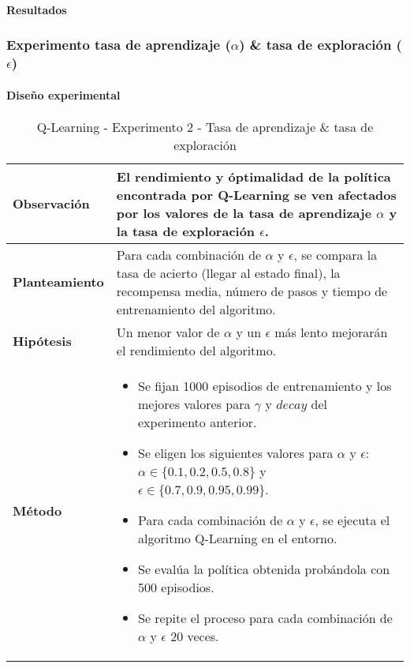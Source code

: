 \paragraph{Resultados}

\subsubsection{Experimento tasa de aprendizaje (\(\alpha\)) \& tasa de exploración (\(\epsilon\))}

\paragraph{Diseño experimental}

\begin{table}[H]
    \centering
    \begin{tabularx}{\textwidth}{|p{4cm}|X|} %
        \hline %
        \textbf{Observación} & El rendimiento y óptimalidad de la política encontrada por Q-Learning se ven afectados por los valores de la tasa de aprendizaje $\alpha$ y la tasa de exploración $\epsilon$. 
        \\ \hline 
        \textbf{Planteamiento} & Para cada combinación de \(\alpha\) y \(\epsilon\), se compara la tasa de acierto (llegar al estado final), la recompensa media, número de pasos y tiempo de entrenamiento del algoritmo.
        \\ \hline 
        \textbf{Hipótesis} & Un menor valor de \(\alpha\) y un \(\epsilon\) más lento mejorarán el rendimiento del algoritmo.
        \\ \hline 
        \textbf{Método} & 
        \begin{itemize}
            \item Se fijan 1000 episodios de entrenamiento y los mejores valores para \(\gamma\) y $decay$ del experimento anterior.
            \item Se eligen los siguientes valores para \(\alpha\) y \(\epsilon\): \(\alpha \in \{0.1, 0.2, 0.5, 0.8\}\) y \(\epsilon \in \{0.7, 0.9, 0.95, 0.99\}\).
            \item Para cada combinación de \(\alpha\) y \(\epsilon\), se ejecuta el algoritmo Q-Learning en el entorno.
            \item Se evalúa la política obtenida probándola con 500 episodios.
            \item Se repite el proceso para cada combinación de \(\alpha\) y \(\epsilon\) 20 veces.
        \end{itemize}
        \\ \hline
    \end{tabularx}
    \caption{Q-Learning - Experimento 2 - Tasa de aprendizaje \& tasa de exploración}
    \label{tab:diseñoQLEarningExp2}
\end{table}

